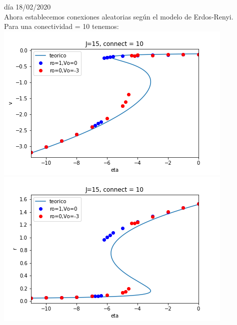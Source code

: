 \documentclass[a4paper]{article}
\begin{document}
día 18/02/2020\\
Ahora establecemos conexiones aleatorias según el modelo de Erdos-Renyi.\\
Para una conectividad = 10 tenemos:\\
\includegraphics[scale=0.7]{v_vs_eta_J15_con10.png}\\
\includegraphics[scale=0.7]{r_vs_eta_J15_con10.png}\\
\end{document}
